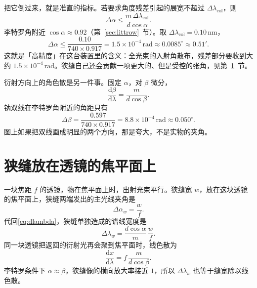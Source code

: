 \documentclass[a4paper,11pt]{ctexart}
\begin{document}
把它倒过来，就是准直的指标。若要求角度残差引起的展宽不超过 \(\Delta\lambda_{\mathrm{col}}\)，则
\begin{equation}
\label{eq:target}
\Delta\alpha \le \frac{m\,\Delta\lambda_{\mathrm{col}}}{d\cos\alpha}.
\end{equation}
李特罗角附近 \(\cos\alpha\approx 0.92\)（第~\ref{sec:littrow}~节）。取 \(\Delta\lambda_{\mathrm{col}}=0.10\,\mathrm{nm}\)，
\begin{equation}
\label{eq:number}
\Delta\alpha \le \frac{0.10}{740\times 0.917}
= 1.5\times 10^{-4}\,\mathrm{rad}
\approx 0.0085^\circ
\approx 0.51'.
\end{equation}
这就是「高精度」在这台装置里的含义：全光束的入射角散布，残差部分要收到大约 \(1.5\times 10^{-4}\,\mathrm{rad}\)。狭缝自己还会贡献一项更大的、但是受控的张角，见第~\ref{sec:slit}~节。

衍射方向上的角色散是另一件事。固定 \(\alpha\)，对 \(\beta\) 微分，
\begin{equation}
\label{eq:dispersion}
\frac{\mathrm{d}\beta}{\mathrm{d}\lambda}
= \frac{m}{d\cos\beta}.
\end{equation}
钠双线在李特罗角附近的角距只有
\begin{equation}
\Delta\beta
= \frac{0.597}{740\times 0.917}
= 8.8\times 10^{-4}\,\mathrm{rad}
\approx 0.050^\circ.
\end{equation}
图上如果把双线画成明显的两个方向，那是夸大，不是实物的夹角。

\section{狭缝放在透镜的焦平面上}
\label{sec:slit}

一块焦距 \(f\) 的透镜，物在焦平面上时，出射光束平行。狭缝宽 \(w\)，放在这块透镜的焦平面上，狭缝两端发出的主光线夹角是
\begin{equation}
\label{eq:slitangle}
\Delta\alpha_w = \frac{w}{f}.
\end{equation}
代回\eqref{eq:dlambda}，狭缝单独造成的谱线宽度是
\begin{equation}
\label{eq:slitlambda}
\Delta\lambda_w = \frac{d\cos\alpha}{m}\,\frac{w}{f}.
\end{equation}
同一块透镜把返回的衍射光再会聚到焦平面时，线色散为
\begin{equation}
\label{eq:linear}
\frac{\mathrm{d}x}{\mathrm{d}\lambda}
= f\,\frac{m}{d\cos\beta}.
\end{equation}
李特罗条件下 \(\alpha\approx\beta\)，狭缝像的横向放大率接近 \(1\)，所以 \(\Delta\lambda_w\) 也等于缝宽除以线色散。
\end{document}
